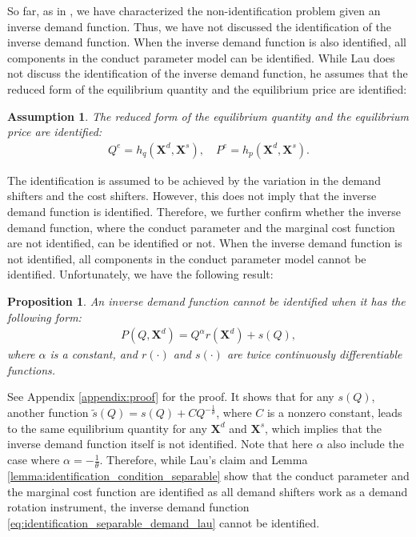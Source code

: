 \documentclass[11pt, a4paper]{article}
\newtheorem{assumption}{Assumption}
\newtheorem{proposition}{Proposition}
\begin{document}
So far, as in \citet{lauIdentifying1982}, we have characterized the non-identification problem given an inverse demand function.
Thus, we have not discussed the identification of the inverse demand function.
When the inverse demand function is also identified, all components in the conduct parameter model can be identified.
While Lau does not discuss the identification of the inverse demand function, he assumes that the reduced form of the equilibrium quantity and the equilibrium price are identified:
\begin{assumption}\label{assumption:reduced_form}
    The reduced form of the equilibrium quantity and the equilibrium price are identified:
    \begin{align}
        Q^e = h_q(\bm{X}^{d}, \bm{X}^{s}), \quad P^e = h_p(\bm{X}^{d}, \bm{X}^{s}).
    \end{align}
\end{assumption}
The identification is assumed to be achieved by the variation in the demand shifters and the cost shifters.
However, this does not imply that the inverse demand function is identified.
Therefore, we further confirm whether the inverse demand function, where the conduct parameter and the marginal cost function are not identified, can be identified or not.
When the inverse demand function is not identified, all components in the conduct parameter model cannot be identified.
Unfortunately, we have the following result:
\begin{proposition}\label{proposition:nonidentification_inverse_demand_with_nonidentifed_conduct_parameter}
    An inverse demand function cannot be identified when it has the following form:
    \begin{align}
        P(Q, \bm{X}^{d}) = Q^{\alpha}r(\bm{X}^{d}) + s(Q),
    \end{align}
    where $\alpha$ is a constant, and $r(\cdot)$ and $s(\cdot)$ are twice continuously differentiable functions.
\end{proposition}
See Appendix \ref{appendix:proof} for the proof.
It shows that for any $s(Q)$, another function $\tilde{s}(Q) = s(Q) + C Q^{-\frac{1}{\theta}}$, where $C$ is a nonzero constant, leads to the same equilibrium quantity for any $\bm{X}^{d}$ and $\bm{X}^{s}$, which implies that the inverse demand function itself is not identified.
Note that here $\alpha$ also include the case where $\alpha = -\frac{1}{\theta}$.
Therefore, while Lau's claim and Lemma \ref{lemma:identification_condition_separable} show that the conduct parameter and the marginal cost function are identified as all demand shifters work as a demand rotation instrument, the inverse demand function \eqref{eq:identification_separable_demand_lau} cannot be identified.
\end{document}

